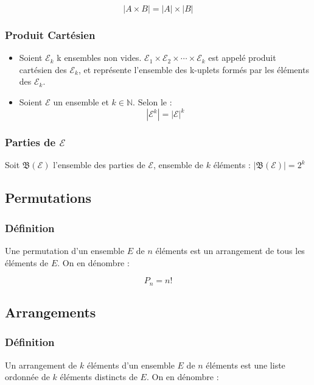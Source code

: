 \documentclass{report}
\newcommand{\bigEps}{\mathcal{E}}
\begin{document}
\[ |A \times B| = |A| \times |B| \]

\subsubsection{Produit Cartésien}

        \begin{itemize}
          \item Soient $\mathcal{E}_k$ k ensembles non vides. $\mathcal{E}_1 \times \mathcal{E}_2 \times \cdots \times \mathcal{E}_k$ est appelé produit cartésien des $\bigEps_k$, et représente l'ensemble des k-uplets formés par les éléments des $\bigEps_k$.
          \item Soient $\bigEps$ un ensemble et $k\in\mathbb{N}$. Selon le  : \[|\bigEps^k| = |\bigEps|^k\]
        \end{itemize}

\subsubsection{Parties de $\bigEps$}

        Soit $\mathfrak{B}(\bigEps)$ l'ensemble des parties de $\bigEps$, ensemble de $k$ éléments : \(|\mathfrak{B}(\bigEps)| = 2^k\)

        

\subsection{Permutations}

  \subsubsection{Définition}
    Une permutation d'un ensemble \( E \) de \( n \) éléments est un arrangement de tous les éléments de \( E \). On en dénombre :

    \[ P_n = n! \]

\subsection{Arrangements}

\subsubsection{Définition}
Un arrangement de \( k \) éléments d'un ensemble \( E \) de \( n \) éléments est une liste ordonnée de \( k \) éléments distincts de \( E \). On en dénombre :
\end{document}
